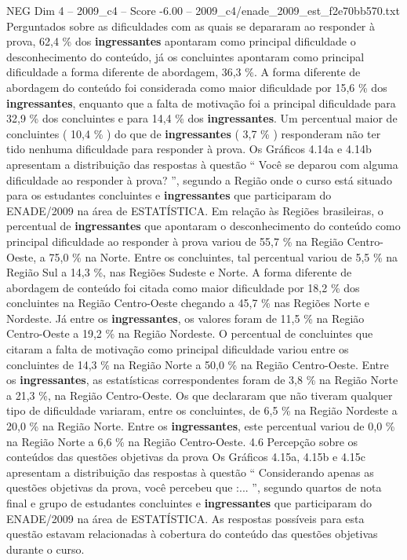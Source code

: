 \begin{textsample}{NEG Dim 4 – 2009\_c4 – Score -6.00 – 2009\_c4/enade\_2009\_est\_f2e70bb570.txt}
Perguntados sobre as dificuldades com as quais se depararam ao responder à prova, 62,4 \% dos \textbf{ingressantes} apontaram como principal dificuldade o desconhecimento do conteúdo, já os concluintes apontaram como principal dificuldade a forma diferente de abordagem, 36,3 \%.
A forma diferente de abordagem do conteúdo foi considerada como maior dificuldade por 15,6 \% dos \textbf{ingressantes}, enquanto que a falta de motivação foi a principal dificuldade para 32,9 \% dos concluintes e para 14,4 \% dos \textbf{ingressantes}.
Um percentual maior de concluintes ( 10,4 \% ) do que de \textbf{ingressantes} ( 3,7 \% ) responderam não ter tido nenhuma dificuldade para responder à prova.
Os Gráficos 4.14a e 4.14b apresentam a distribuição das respostas à questão “ Você se deparou com alguma dificuldade ao responder à prova? ”, segundo a Região onde o curso está situado para os estudantes concluintes e \textbf{ingressantes} que participaram do ENADE/2009 na área de ESTATÍSTICA.
Em relação às Regiões brasileiras, o percentual de \textbf{ingressantes} que apontaram o desconhecimento do conteúdo como principal dificuldade ao responder à prova variou de 55,7 \% na Região Centro-Oeste, a 75,0 \% na Norte.
Entre os concluintes, tal percentual variou de 5,5 \% na Região Sul a 14,3 \%, nas Regiões Sudeste e Norte.
A forma diferente de abordagem de conteúdo foi citada como maior dificuldade por 18,2 \% dos concluintes na Região Centro-Oeste chegando a 45,7 \% nas Regiões Norte e Nordeste.
Já entre os \textbf{ingressantes}, os valores foram de 11,5 \% na Região Centro-Oeste a 19,2 \% na Região Nordeste.
O percentual de concluintes que citaram a falta de motivação como principal dificuldade variou entre os concluintes de 14,3 \% na Região Norte a 50,0 \% na Região Centro-Oeste.
Entre os \textbf{ingressantes}, as estatísticas correspondentes foram de 3,8 \% na Região Norte a 21,3 \%, na Região Centro-Oeste.
Os que declararam que não tiveram qualquer tipo de dificuldade variaram, entre os concluintes, de 6,5 \% na Região Nordeste a 20,0 \% na Região Norte.
Entre os \textbf{ingressantes}, este percentual variou de 0,0 \% na Região Norte a 6,6 \% na Região Centro-Oeste. 4.6 Percepção sobre os conteúdos das questões objetivas da prova Os Gráficos 4.15a, 4.15b e 4.15c apresentam a distribuição das respostas à questão “ Considerando apenas as questões objetivas da prova, você percebeu que :... ”, segundo quartos de nota final e grupo de estudantes concluintes e \textbf{ingressantes} que participaram do ENADE/2009 na área de ESTATÍSTICA.
As respostas possíveis para esta questão estavam relacionadas à cobertura do conteúdo das questões objetivas durante o curso.

\end{textsample}
